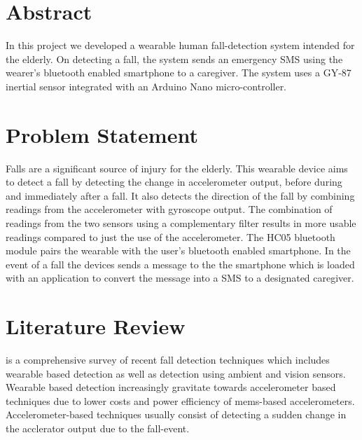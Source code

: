 \documentclass[11pt, a4paper]{article}
\begin{document}
\pagestyle{plain}
\def\title{Human Fall Detection}
\def\what{EE712 Embedded System Design}
\def\who{Simranjeet Singh (183076005) (183076005@iitb.ac.in) \\ Sonali Shukla (184070014) (184070014@iitb.ac.in) \\ Niraj N Sharma (184077001) (nirajns@iitb.ac.in) \\ Group 20}
\def\guide{Prof.~P.~C.~Pandey \& Prof.~D.~K.~Sharma}
\titlpage
\newpage

\section*{Abstract}
In this project we developed a wearable human fall-detection system
intended for the elderly. On detecting a fall, the system sends an
emergency SMS using the wearer's bluetooth enabled smartphone to a
caregiver. The system uses a GY-87 inertial sensor integrated with an
Arduino Nano micro-controller.

\section{Problem Statement}
Falls are a significant source of injury for the elderly. This wearable
device aims to detect a fall by detecting the change in accelerometer
output, before during and immediately after a fall. It also detects the
direction of the fall by combining readings from the accelerometer with
gyroscope output. The combination of readings from the two sensors using a
complementary filter results in more usable readings compared to
just the use of the accelerometer. The HC05 bluetooth module pairs the
wearable with the user's bluetooth enabled smartphone. In the event of a
fall the devices sends a message to the the smartphone which is loaded
with an application to convert the message into a SMS to a designated
caregiver.

\section{Literature Review}
\cite{Mubashir2013} is a comprehensive survey of recent fall detection
techniques which includes wearable based detection as well as detection
using ambient and vision sensors. Wearable based detection increasingly
gravitate towards accelerometer based techniques due to lower costs and
power efficiency of mems-based accelerometers. Accelerometer-based techniques usually consist of detecting a sudden change in the
acclerator output due to the fall-event.
\end{document}
